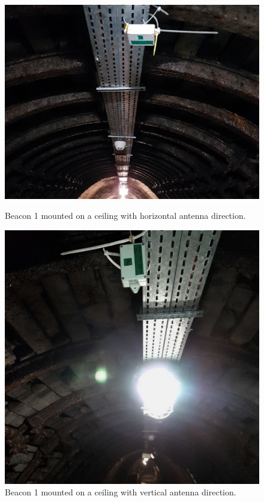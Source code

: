 \documentclass[../main.tex]{subfiles}
\begin{document}
\begin{figure}[!htbp]
\begin{minipage}{0.49\linewidth}
\includegraphics[width=\textwidth, trim={3cm 0 3cm 0},clip]{pictures/tests_beacon_celing_horizontal.pdf}
\caption{Beacon 1 mounted on a ceiling with horizontal antenna direction.}
\label{fig:tests_beacon_celing_horizontal}
\end{minipage}\hfill%
\begin{minipage}{0.49\linewidth}
\includegraphics[width=\textwidth, trim={0 1cm 0 0},clip]{pictures/tests_beacon_celing_vertical.pdf}
\caption{Beacon 1 mounted on a ceiling with vertical antenna direction.}
\label{fig:tests_beacon_celing_vertical}
\end{minipage}
\end{figure}
\end{document}
